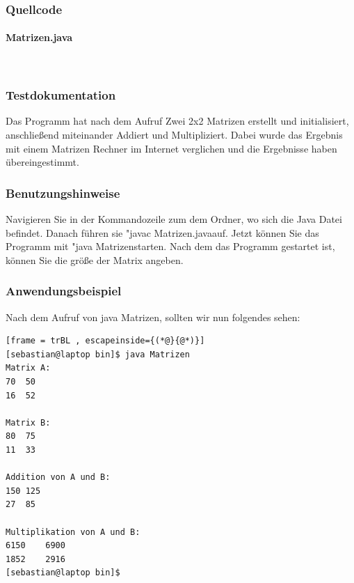 \subsubsection{Quellcode}
\paragraph{Matrizen.java}\


\subsubsection{Testdokumentation}
Das Programm hat nach dem Aufruf Zwei 2x2 Matrizen erstellt und initialisiert, anschlie\ss end 
miteinander Addiert und Multipliziert. Dabei wurde das Ergebnis mit einem Matrizen Rechner im Internet
verglichen und die Ergebnisse haben übereingestimmt.

\subsubsection{Benutzungshinweise}
Navigieren Sie in der Kommandozeile zum dem Ordner, wo sich die Java Datei befindet.
Danach führen sie "javac Matrizen.java\dq \space auf. Jetzt können Sie das Programm mit
"java Matrizen\dq \space starten. Nach dem das Programm gestartet ist, können Sie die
grö\ss e der Matrix angeben.

\subsubsection{Anwendungsbeispiel}
Nach dem Aufruf von java Matrizen, sollten wir nun folgendes sehen:
\begin{lstlisting}[frame = trBL , escapeinside={(*@}{@*)}]
[sebastian@laptop bin]$ java Matrizen
Matrix A:
70	50	
16	52	

Matrix B:
80	75	
11	33	

Addition von A und B:
150	125	
27	85	

Multiplikation von A und B:
6150	6900	
1852	2916
[sebastian@laptop bin]$  
\end{lstlisting}
